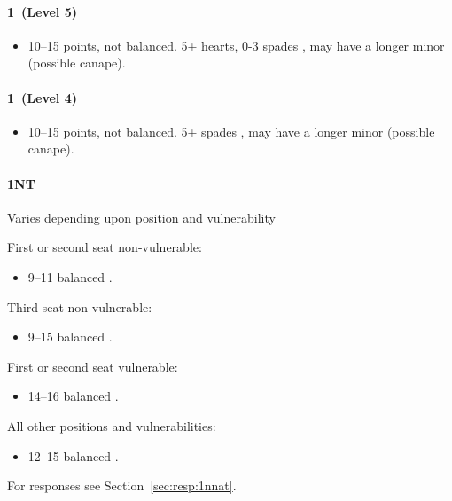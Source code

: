 \documentclass[a4paper,14pt]{extarticle}
\begin{document}
{\it

\paragraph{1\spades~(Level 5)}

\begin{itemize}
\item 10--15 points, not balanced. 5+ hearts, 0-3 spades , may have a longer minor (possible canape).
\end{itemize}

}

{\color{CadetBlue}

\paragraph{1\spades~(Level 4)}

\begin{itemize}
\item 10--15 points, not balanced. 5+ spades , may have a longer minor (possible canape).
\end{itemize}
}

\paragraph{1NT}

Varies depending upon position and vulnerability 

First or second seat non-vulnerable:
\begin{itemize}
\item 9--11 balanced .
\end{itemize}

Third seat non-vulnerable:
\begin{itemize}
\item 9--15 balanced .
\end{itemize}

First or second seat vulnerable:
\begin{itemize}
\item 14--16 balanced .
\end{itemize}

All other positions and vulnerabilities:
\begin{itemize}
\item 12--15 balanced .
\end{itemize}

For responses see Section~\ref{sec:resp:1nnat}.
\end{document}

